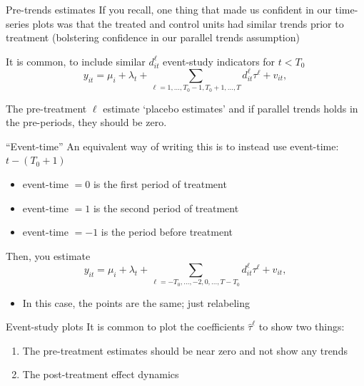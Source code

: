 \documentclass[aspectratio=169,t,11pt,table]{beamer}
\begin{document}
\begin{frame}{Pre-trends estimates}
  If you recall, one thing that made us confident in our time-series plots was that the treated and control units had similar trends prior to treatment (bolstering confidence in our parallel trends assumption)

  \pause
  \bigskip
  It is common, to include similar $d_{it}^\ell$ event-study indicators for $t < T_0$
  $$
    y_{it} = \mu_i + \lambda_t + \sum_{\ell = 1, \dots, T_0 - 1, T_0 + 1, \dots, T} d_{it}^\ell \tau^\ell + v_{it},
  $$
  
  The pre-treatment $\ell$ estimate `placebo estimates' and if parallel trends holds in the pre-periods, they should be zero.
\end{frame}

\begin{frame}{``Event-time''}
  An equivalent way of writing this is to instead use event-time: $t - (T_0 + 1)$
  \begin{itemize}
    \item event-time $= 0$ is the first period of treatment
    \item event-time $= 1$ is the second period of treatment
    \item event-time $= -1$ is the period before treatment
  \end{itemize}

  \bigskip
  Then, you estimate 
  $$
    y_{it} = \mu_i + \lambda_t + \sum_{\ell = -T_0, \dots, -2, 0, \dots, T - T_0} d_{it}^\ell \tau^\ell + v_{it},
  $$
  
  \begin{itemize}
    \item In this case, the points are the same; just relabeling
  \end{itemize}
\end{frame}

\begin{frame}{Event-study plots}
  It is common to plot the coefficients $\hat{\tau}^\ell$ to show two things:
  \begin{enumerate}
    \item The pre-treatment estimates should be near zero and not show any trends
    
    \item The post-treatment effect dynamics
  \end{enumerate}
\end{frame}

\end{document}
